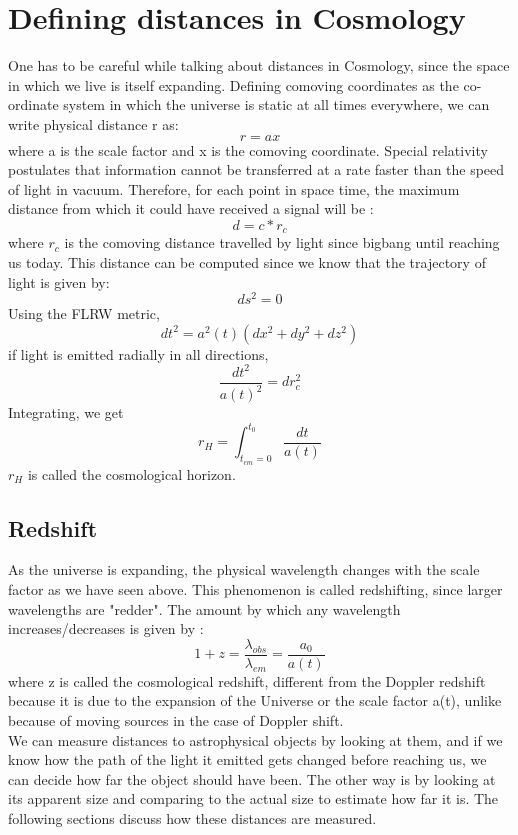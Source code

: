 \documentclass[12pt,a4paper,oneside]{book}
\begin{document}
\section{Defining distances in Cosmology}
One has to be careful while talking about distances in Cosmology, since the space in which we live is itself expanding. Defining comoving coordinates as the co-ordinate system in which the universe is static at all times everywhere, we can write physical distance r as:
\begin{equation}
    r = a x
\end{equation}
where a is the scale factor and x is the comoving coordinate. Special relativity postulates that information cannot be transferred at a rate faster than the speed of light in vacuum. Therefore, for each point in space time, the maximum distance from which it could have received a signal will be :
\begin{equation}
    d = c*r_{c}
\end{equation}
where $r_{c}$ is the comoving distance travelled by light since bigbang until reaching us today. This distance can be computed since we know that the trajectory of light is given by:
\begin{equation}
    ds^{2} = 0
\end{equation}
Using the FLRW metric,
\begin{equation}
    dt^{2} = a^{2}(t)(dx^2+dy^2+dz^2)
\end{equation}
if light is emitted radially in all directions,
\begin{equation}
    \frac{dt^2}{a(t)^2} = dr_{c}^2
\end{equation}
Integrating, we get
\begin{equation}
    r_{H}  = \int_{t_{em}=0}^{t_{0}} \frac{dt}{a(t)}
\end{equation}
$r_{H}$ is called the cosmological horizon.
\subsection{Redshift}
As the universe is expanding, the physical wavelength changes with the scale factor as we have seen above. This phenomenon is called redshifting, since larger wavelengths are "redder". The amount by which any wavelength increases/decreases is given by :
\begin{equation}
    1+z = \frac{\lambda_{obs}}{\lambda_{em}} = \frac{a_{0}}{a(t)}
\end{equation}
where z is called the cosmological redshift, different from the Doppler redshift because it is due to the expansion of the Universe or the scale factor a(t), unlike because of moving sources in the case of Doppler shift.
\\We can measure distances to astrophysical objects by looking at them, and if we know how the path of the light it emitted gets changed before reaching us, we can decide how far the object should have been. The other way is by looking at its apparent size and comparing to the actual size to estimate how far it is. The following sections discuss how these distances are measured.
\end{document}
